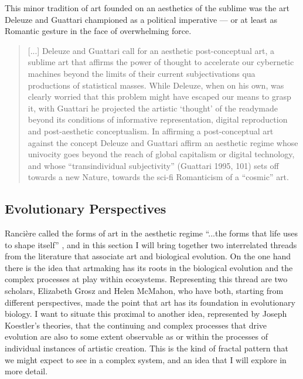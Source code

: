         This minor tradition of art founded on an aesthetics of the sublime was the art Deleuze and Guattari championed as a political imperative — or at least as Romantic gesture in the face of overwhelming force.

        \begin{quote}
            [...] Deleuze and Guattari call for an aesthetic post-conceptual art, a sublime art that affirms the power of thought to accelerate our cybernetic machines beyond the limits of their current subjectivations qua productions of statistical masses. While Deleuze, when on his own, was clearly worried that this problem might have escaped our means to grasp it, with Guattari he projected the artistic ‘thought’ of the readymade beyond its conditions of informative representation, digital reproduction and post-aesthetic conceptualism. In affirming a post-conceptual art against the concept Deleuze and Guattari affirm an aesthetic regime whose univocity goes beyond the reach of global capitalism or digital technology, and whose “transindividual subjectivity” (Guattari 1995, 101) sets off towards a new Nature, towards the sci-fi Romanticism of a “cosmic” art. \citep[p.763]{ZepkeAWrkOfArt2017}
        \end{quote}
        
    \subsection{Evolutionary Perspectives} \label{sec:EvolutionaryPerspectives} 

        Rancière called the forms of art in the aesthetic regime “...the forms that life uses to shape itself” \citep[p.23]{RancierPltcsOfThAsthtcs2004}, and in this section I will bring together two interrelated threads from the literature that associate art and biological evolution. On the one hand there is the idea that artmaking has its roots in the biological evolution and the complex processes at play within ecosystems. Representing this thread are two scholars, Elizabeth Grosz and Helen McMahon, who have both, starting from different perspectives, made the point that art has its foundation in evolutionary biology. I want to situate this proximal to another idea, represented by Joseph Koestler's theories, that the continuing and complex processes that drive evolution are also to some extent observable as or within the processes of individual instances of artistic creation. This is the kind of fractal pattern that we might expect to see in a complex system, and an idea that I will explore in more detail.
        
